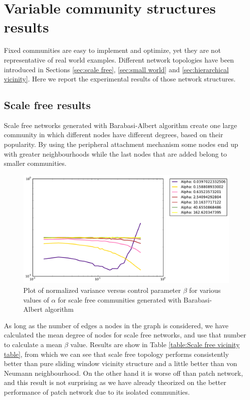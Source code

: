 \section{Variable community structures results}
\label{sec:hierarchical}

Fixed communities are easy to implement and optimize, yet they are not representative of real world examples.
Different network topologies have been introduced in Sections \ref{sec:scale free}, \ref{sec:small world} and \ref{sec:hierarchical vicinity}. Here we report the experimental results of those network structures.

\subsection{Scale free results}

Scale free networks generated with Barabasi-Albert algorithm create one large community in which different nodes have different degrees, based on their popularity.
By using the peripheral attachment mechanism some nodes end up with greater neighbourhoods while the last nodes that are added belong to smaller communities.

\begin{figure}[h]
\begin{center}
\includegraphics[scale=0.4]{images/results/vicinity_Barabasi_n403_rounds10000_partial.pdf}
\caption{Plot of normalized variance versus control parameter $\beta$ for various values of $\alpha$  for scale free communities generated with Barabasi-Albert algorithm}
\label{fig:scale free vicinity partial}
\end{center}
\end{figure}

As long as the number of edges a nodes in the graph is considered, we have calculated the mean degree of nodes for scale free networks, and use that number to calculate a mean $\beta$ value.
Results are show in Table \ref{table:Scale free vicinity table}, from which we can see that scale free topology performs consistently better than pure sliding window vicinity structure and a little better than von Neumann neighbourhood.
On the other hand it is worse off than patch network, and this result is not surprising as we have already theorized on the better performance of patch network due to its isolated communities.

